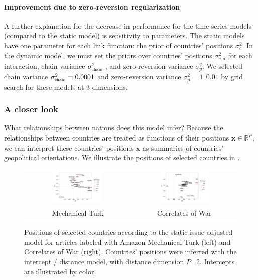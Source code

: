 \paragraph{Improvement due to zero-reversion regularization}
A further explanation for the decrease in performance for the
time-series models (compared to the static model) is sensitivity to
parameters.  The static models have one parameter for each link
function: the prior of countries' positions $\sigma_{c}^2$.  In the
dynamic model, we must set the priors over countries' positions
$\sigma_{c,d}^2$ for each interaction, chain variance
$\sigma_{\mbox{\tiny chain }}^2$, and zero-reversion variance
$\sigma_{p}^2$.  We selected chain variance $\sigma_{\mbox{\tiny
    chain}}^2=0.0001$ and zero-reversion variance $\sigma_p^2=1,0.01$
by grid search for these models at $3$ dimensions.

\subsubsection{A closer look}
What relationships between nations does this model infer?  Because the
relationships between countries are treated as functions of their
positions $\bm x \in \mathbb{R}^P$, we can interpret these countries'
positions $\bm x$ as summaries of countries' geopolitical
orientations.  We illustrate the positions of selected countries in
.

\begin{figure}
  \begin{tabular}{cc}
    \includegraphics[width=0.5\textwidth]{chapter_foreign_relations/figures/011_static_positions_mturk.pdf} &
    \includegraphics[width=0.5\textwidth]{chapter_foreign_relations/figures/011_static_positions_cow.pdf}
    \\
    Mechanical Turk & Correlates of War \\
  \end{tabular}
  \caption{Positions of selected countries according to the static
    issue-adjusted model for articles labeled with Amazon Mechanical
    Turk (left) and Correlates of War (right).  Countries' positions
    were inferred with the intercept / distance model, with distance
    dimension $P$=2.  Intercepts are illustrated by color.}
  \label{fig:fr_intercept_distance_positions}
\end{figure}

